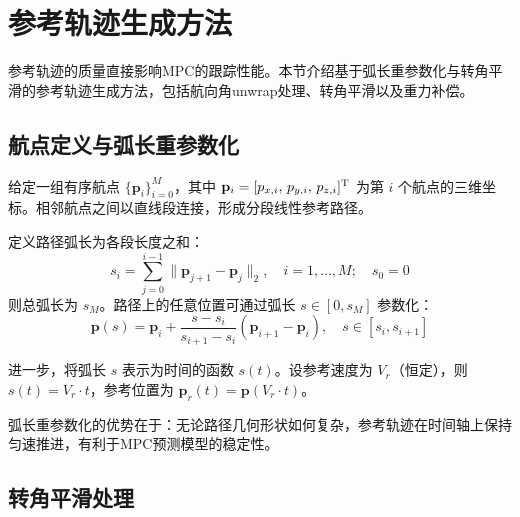 \section{参考轨迹生成方法}\label{sec:trajectory}

参考轨迹的质量直接影响MPC的跟踪性能。本节介绍基于弧长重参数化与转角平滑的参考轨迹生成方法，包括航向角unwrap处理、转角平滑以及重力补偿。

\subsection{航点定义与弧长重参数化}\label{sec:arc_length}

给定一组有序航点 $\{\mathbf{p}_i\}_{i=0}^{M}$，其中 $\mathbf{p}_i = [p_{x,i},\, p_{y,i},\, p_{z,i}]^{\mathrm{T}}$ 为第 $i$ 个航点的三维坐标。相邻航点之间以直线段连接，形成分段线性参考路径。

定义路径弧长为各段长度之和：
\begin{equation}\label{eq:arc_length}
s_i = \sum_{j=0}^{i-1} \|\mathbf{p}_{j+1} - \mathbf{p}_j\|_2, \quad i = 1, \ldots, M; \quad s_0 = 0
\end{equation}
则总弧长为 $s_M$。路径上的任意位置可通过弧长 $s \in [0, s_M]$ 参数化：
\begin{equation}\label{eq:path_param}
\mathbf{p}(s) = \mathbf{p}_i + \frac{s - s_i}{s_{i+1} - s_i}(\mathbf{p}_{i+1} - \mathbf{p}_i), \quad s \in [s_i, s_{i+1}]
\end{equation}

进一步，将弧长 $s$ 表示为时间的函数 $s(t)$。设参考速度为 $V_r$（恒定），则 $s(t) = V_r \cdot t$，参考位置为 $\mathbf{p}_r(t) = \mathbf{p}(V_r \cdot t)$。

弧长重参数化的优势在于：无论路径几何形状如何复杂，参考轨迹在时间轴上保持匀速推进，有利于MPC预测模型的稳定性。

\subsection{转角平滑处理}\label{sec:corner_smoothing}

